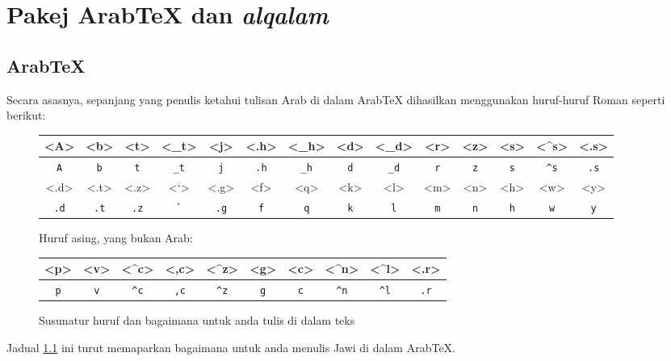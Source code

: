 \chapter{Pakej Arab\TeX{} dan \emph{alqalam}}

\section{Arab\TeX{}}

Secara asasnya, sepanjang yang penulis ketahui tulisan Arab di dalam Arab\TeX{} dihasilkan menggunakan huruf-huruf Roman seperti berikut:\\

\begin{figure}[h!tb]
\begin{center}
\begin{tabular}{|c|c|c|c|c|c|c|c|c|c|c|c|c|c|}
\hline
\rule[-6pt]{0pt}{16pt}
<A> & <b> & <t> & <_t> & <j> & <.h> & <_h> &
<d> & <_d> & <r> & <z> & <s> & <^s> & <.s> \\
\hline
\verb#A# & \verb#b# & \verb#t# & \verb#_t# & \verb#j# & \verb#.h# & \verb#_h# &
\verb#d# & \verb#_d# & \verb#r# & \verb#z# & \verb#s# & \verb#^s# & \verb#.s#\\
\hline
\hline
\rule[-7pt]{0pt}{17pt}
<.d> & <.t> & <.z> & <`> & <.g> & <f> & <q> &
<k> & <l> & <m> & <n> & <h> & <w> & <y> \\
\hline
\verb#.d# & \verb#.t# & \verb#.z# & \verb#`# & \verb#.g# & \verb#f# & \verb#q# &
\verb#k# & \verb#l# & \verb#m# & \verb#n# & \verb#h# & \verb#w# & \verb#y# \\
\hline
\end{tabular}
\end{center}

Huruf asing, yang bukan Arab:\smallskip
\begin{center}
\begin{tabular}{|c|c|c|c|c|c|c|c|c|c|}
\hline
<p> & <v> & <^c> & <,c> & <^z> & <g> & <c> & <^n> & <^l> & <.r> \\
\hline
\verb#p# & \verb#v# & \verb#^c# & \verb#,c# & \verb#^z# & \verb#g# &
\verb#c# & \verb#^n# & \verb#^l# & \verb#.r# \\
\hline
\end{tabular}
\end{center}
\caption{Susunatur huruf dan bagaimana untuk anda tulis di dalam teks \ArabTeX{}\cite{paut-arab}}
\label{arab-rujuk}
\end{figure}

Jadual \ref{arab-rujuk} ini turut memaparkan bagaimana untuk anda menulis Jawi di dalam Arab\TeX{}.


